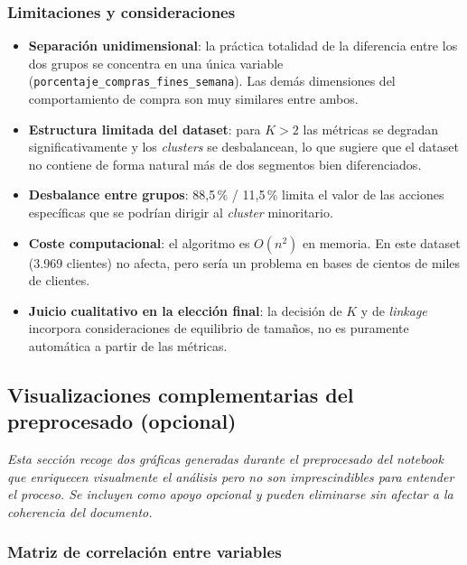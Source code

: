 \documentclass[11pt,a4paper]{article}
\begin{document}
\subsubsection{Limitaciones y consideraciones}

\begin{itemize}
    \item \textbf{Separación unidimensional}: la práctica totalidad de la diferencia entre los dos grupos se concentra en una única variable (\texttt{porcentaje\_compras\_fines\_semana}). Las demás dimensiones del comportamiento de compra son muy similares entre ambos.
    \item \textbf{Estructura limitada del dataset}: para $K > 2$ las métricas se degradan significativamente y los \textit{clusters} se desbalancean, lo que sugiere que el dataset no contiene de forma natural más de dos segmentos bien diferenciados.
    \item \textbf{Desbalance entre grupos}: 88,5\,\% / 11,5\,\% limita el valor de las acciones específicas que se podrían dirigir al \textit{cluster} minoritario.
    \item \textbf{Coste computacional}: el algoritmo es $O(n^2)$ en memoria. En este dataset (3.969 clientes) no afecta, pero sería un problema en bases de cientos de miles de clientes.
    \item \textbf{Juicio cualitativo en la elección final}: la decisión de $K$ y de \textit{linkage} incorpora consideraciones de equilibrio de tamaños, no es puramente automática a partir de las métricas.
\end{itemize}

\subsection{Visualizaciones complementarias del preprocesado (opcional)}

\begin{tcolorbox}[colback=gray!5,colframe=gray!40,boxrule=0.5pt]
\textit{Esta sección recoge dos gráficas generadas durante el preprocesado del notebook que enriquecen visualmente el análisis pero no son imprescindibles para entender el proceso. Se incluyen como apoyo opcional y pueden eliminarse sin afectar a la coherencia del documento.}
\end{tcolorbox}

\subsubsection{Matriz de correlación entre variables}
\end{document}
